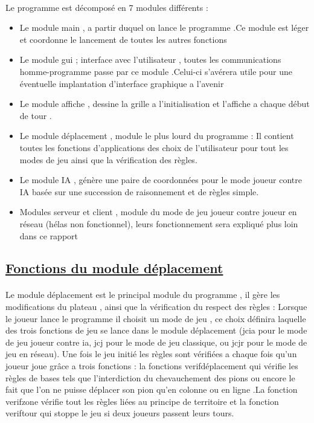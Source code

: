 \documentclass[a4paper,12pt]{article}
\begin{document}
\paragraph{}
Le programme est décomposé en 7 modules différents :
\begin{itemize}
\item Le module main , a partir duquel on lance le programme .Ce module est léger et coordonne le lancement de toutes les autres fonctions
\item Le module gui ; interface avec l'utilisateur , toutes les communications homme-programme passe par ce module .Celui-ci s'avérera utile pour une éventuelle implantation d'interface graphique a l'avenir
\item Le module affiche , dessine la grille a l'initialisation et l'affiche a chaque début de tour .
\item Le module déplacement , module le plus lourd du programme : Il contient toutes les fonctions d'applications  des choix de l'utilisateur pour tout les modes de jeu ainsi que la vérification des règles.
\item Le module IA , génère une paire de coordonnées pour le mode joueur contre IA basée sur une succession de raisonnement et de règles simple.
\item Modules serveur et client , module du mode de jeu joueur contre joueur en réseau (hélas non fonctionnel), leurs fonctionnement sera expliqué plus loin dans ce rapport
\end{itemize}
\vspace{1cm}
\subsection{\underline{Fonctions du module déplacement }}
\paragraph{}
Le module déplacement est le principal module du programme , il gère les modifications du plateau , ainsi que la vérification du respect des règles :
\newline Lorsque le joueur lance le programme il choisit un mode de jeu , ce choix définira laquelle des trois fonctions de jeu se lance dans le module déplacement (jcia pour le mode de jeu joueur contre ia, jcj pour le mode de jeu classique, ou jcjr pour le mode de jeu en réseau). 
\newline
Une fois le jeu initié les règles sont vérifiées a chaque fois qu'un joueur joue grâce a trois fonctions : la fonctions verifdéplacement qui vérifie les règles de bases tels que l'interdiction du chevauchement des pions ou encore le fait que l'on ne puisse déplacer son pion qu'en colonne ou en ligne .La fonction verifzone vérifie tout les règles liées au principe de territoire et la fonction veriftour qui stoppe le jeu si deux joueurs passent leurs tours.
\end{document}
